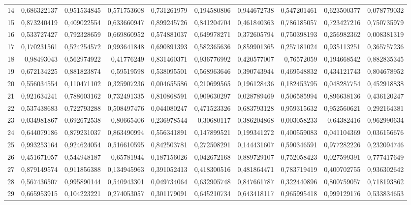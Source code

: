 \documentclass{article}
\begin{document}
\begin{landscape}
\begin{longtable}{lrrrrrrrrr}
14	&	0,686322137	&	0,951534845	&	0,571753608	&	0,731261979	&	0,194580806	&	0,944672738	&	0,547201461	&	0,623500377	&	0,078779032	\\
15	&	0,873240419	&	0,409022554	&	0,633660947	&	0,899245726	&	0,841204704	&	0,461840363	&	0,786185057	&	0,723427216	&	0,750735979	\\
16	&	0,533727427	&	0,792328659	&	0,669860952	&	0,574881037	&	0,649978271	&	0,372605794	&	0,750398193	&	0,256982362	&	0,008381319	\\
17	&	0,170231561	&	0,524254572	&	0,993641848	&	0,690891393	&	0,582365636	&	0,859901365	&	0,257181024	&	0,935113251	&	0,365757236	\\
18	&	0,98493043	&	0,562974922	&	0,41776249	&	0,831460371	&	0,936776992	&	0,420577007	&	0,76572059	&	0,194668542	&	0,882835345	\\
19	&	0,672134225	&	0,881823874	&	0,59519598	&	0,538095501	&	0,568963646	&	0,390743944	&	0,469548832	&	0,434121743	&	0,804678952	\\
20	&	0,556034554	&	0,110471102	&	0,325907236	&	0,004655586	&	0,210699565	&	0,196128436	&	0,182453795	&	0,048287754	&	0,452918838	\\
21	&	0,921634241	&	0,788603162	&	0,732491335	&	0,810868591	&	0,909630297	&	0,028789469	&	0,506585994	&	0,896638136	&	0,436120247	\\
22	&	0,537438683	&	0,722793288	&	0,508497476	&	0,044080247	&	0,471523326	&	0,683793128	&	0,959315632	&	0,952560621	&	0,292164381	\\
23	&	0,034981867	&	0,692672538	&	0,80665406	&	0,236978544	&	0,30680117	&	0,386204868	&	0,003058233	&	0,64382416	&	0,962990634	\\
24	&	0,644079186	&	0,879231037	&	0,863490994	&	0,556341891	&	0,147899521	&	0,199341272	&	0,400559083	&	0,041104369	&	0,036156676	\\
25	&	0,993253164	&	0,924624054	&	0,516610595	&	0,842503781	&	0,272508291	&	0,144431607	&	0,590346591	&	0,977282226	&	0,232094746	\\
26	&	0,451671057	&	0,544948187	&	0,65781944	&	0,187156026	&	0,042672168	&	0,889729107	&	0,752058423	&	0,027599391	&	0,777417649	\\
27	&	0,879149574	&	0,911856388	&	0,134945963	&	0,391052413	&	0,418300516	&	0,481864471	&	0,783719419	&	0,400702755	&	0,936302642	\\
28	&	0,567436507	&	0,995890144	&	0,540943301	&	0,049734064	&	0,632905748	&	0,847661787	&	0,322440896	&	0,800759057	&	0,718193862	\\
29	&	0,665953915	&	0,104223221	&	0,274053057	&	0,301179091	&	0,645210734	&	0,643418117	&	0,965995418	&	0,999129176	&	0,533834653	\\

\end{longtable}
\end{landscape}
\end{document}
